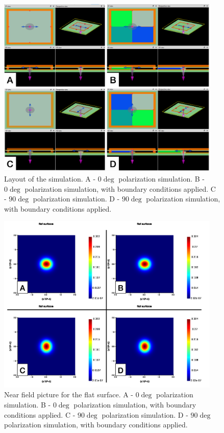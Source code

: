 \documentclass[11pt,a4paper]{article}
\begin{document}
\begin{figure}
        \includegraphics[width=0.95\textwidth]{1.png}
        \caption{Layout of the simulation. A - $0\deg$ polarization simulation. B - $0\deg$ polarization simulation, with boundary conditions applied. C - $90\deg$ polarization simulation. D - $90\deg$ polarization simulation, with boundary conditions applied.}
\end{figure}
\begin{figure}
        \includegraphics[width=0.95\textwidth]{2.png}
        \caption{Near field picture for the flat surface. A - $0\deg$ polarization simulation. B - $0\deg$ polarization simulation, with boundary conditions applied. C - $90\deg$ polarization simulation. D - $90\deg$ polarization simulation, with boundary conditions applied.}
\end{figure}
\end{document}
